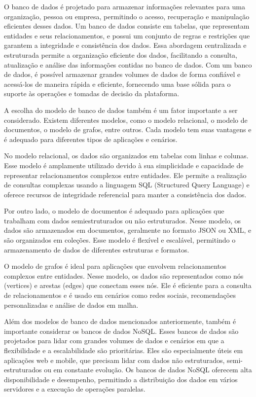 \documentclass[tcc,capa]{texufpel}
\begin{document}
O banco de dados é projetado para armazenar informações relevantes para uma organização, pessoa ou empresa, permitindo o acesso, recuperação e manipulação eficientes desses dados. Um banco de dados consiste em tabelas, que representam entidades e seus relacionamentos, e possui um conjunto de regras e restrições que garantem a integridade e consistência dos dados. Essa abordagem centralizada e estruturada permite a organização eficiente dos dados, facilitando a consulta, atualização e análise das informações contidas no banco de dados. Com um banco de dados, é possível armazenar grandes volumes de dados de forma confiável e acessá-los de maneira rápida e eficiente, fornecendo uma base sólida para o suporte às operações e tomadas de decisão da plataforma.

A escolha do modelo de banco de dados também é um fator importante a ser considerado. Existem diferentes modelos, como o modelo relacional, o modelo de documentos, o modelo de grafos, entre outros. Cada modelo tem suas vantagens e é adequado para diferentes tipos de aplicações e cenários.

No modelo relacional, os dados são organizados em tabelas com linhas e colunas. Esse modelo é amplamente utilizado devido à sua simplicidade e capacidade de representar relacionamentos complexos entre entidades. Ele permite a realização de consultas complexas usando a linguagem SQL (Structured Query Language) e oferece recursos de integridade referencial para manter a consistência dos dados.

Por outro lado, o modelo de documentos é adequado para aplicações que trabalham com dados semiestruturados ou não estruturados. Nesse modelo, os dados são armazenados em documentos, geralmente no formato JSON ou XML, e são organizados em coleções. Esse modelo é flexível e escalável, permitindo o armazenamento de dados de diferentes estruturas e formatos.

O modelo de grafos é ideal para aplicações que envolvem relacionamentos complexos entre entidades. Nesse modelo, os dados são representados como nós (vertices) e arestas (edges) que conectam esses nós. Ele é eficiente para a consulta de relacionamentos e é usado em cenários como redes sociais, recomendações personalizadas e análise de dados em malha.

Além dos modelos de banco de dados mencionados anteriormente, também é importante considerar os bancos de dados NoSQL. Esses bancos de dados são projetados para lidar com grandes volumes de dados e cenários em que a flexibilidade e a escalabilidade são prioritárias. Eles são especialmente úteis em aplicações web e mobile, que precisam lidar com dados não estruturados, semi-estruturados ou em constante evolução. Os bancos de dados NoSQL oferecem alta disponibilidade e desempenho, permitindo a distribuição dos dados em vários servidores e a execução de operações paralelas.
\end{document}
